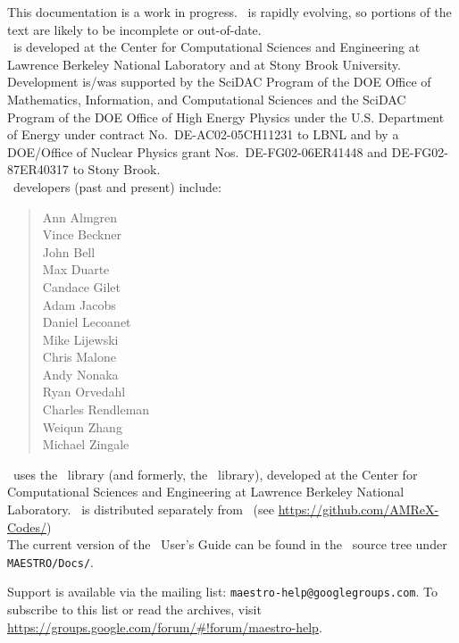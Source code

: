 This documentation is a work in progress.  \maestro\ is rapidly
evolving, so portions of the text are likely to be incomplete or
out-of-date. \\

\noindent \maestro\ is developed at the Center for Computational Sciences and
Engineering at Lawrence Berkeley National Laboratory and at Stony
Brook University.  Development is/was supported by the SciDAC Program of
the DOE Office of Mathematics, Information, and Computational Sciences
and the SciDAC Program of the DOE Office of High Energy Physics under
the U.S. Department of Energy under contract No.\ DE-AC02-05CH11231 to
LBNL and by a DOE/Office of Nuclear Physics grant Nos.\
DE-FG02-06ER41448 and DE-FG02-87ER40317 to Stony Brook.  \\

\noindent \maestro\ developers (past and present) include: 
\begin{quote}
Ann Almgren \\
Vince Beckner \\
John Bell \\
Max Duarte \\
Candace Gilet \\
Adam Jacobs \\
Daniel Lecoanet \\
Mike Lijewski \\
Chris Malone \\
Andy Nonaka \\
Ryan Orvedahl \\
Charles Rendleman \\
Weiqun Zhang \\
Michael Zingale
\end{quote}

\noindent \maestro\ uses the \fboxlib\ library (and formerly, the
\boxlib\ library), developed at the Center for Computational Sciences
and Engineering at Lawrence Berkeley National Laboratory.  \fboxlib\ is
distributed separately from \maestro\ (see
\url{https://github.com/AMReX-Codes/}) \\

\noindent The current version of the \maestro\ User's Guide can be found in 
the \maestro\ source tree under {\tt MAESTRO/Docs/}.


\noindent Support is available via the mailing list: {\tt maestro-help@googlegroups.com}.  To subscribe to this list or read the archives, visit
\url{https://groups.google.com/forum/#!forum/maestro-help}.
